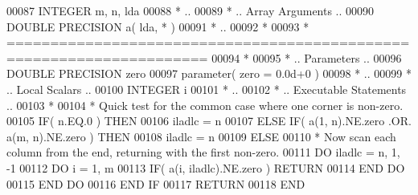 \begin{DoxyCode}
00087       \textcolor{keywordtype}{INTEGER}            m, n, lda
00088 \textcolor{comment}{*     ..}
00089 \textcolor{comment}{*     .. Array Arguments ..}
00090       \textcolor{keywordtype}{DOUBLE PRECISION}   a( lda, * )
00091 \textcolor{comment}{*     ..}
00092 \textcolor{comment}{*}
00093 \textcolor{comment}{*  =====================================================================}
00094 \textcolor{comment}{*}
00095 \textcolor{comment}{*     .. Parameters ..}
00096       \textcolor{keywordtype}{DOUBLE PRECISION} zero
00097       parameter( zero = 0.0d+0 )
00098 \textcolor{comment}{*     ..}
00099 \textcolor{comment}{*     .. Local Scalars ..}
00100       \textcolor{keywordtype}{INTEGER} i
00101 \textcolor{comment}{*     ..}
00102 \textcolor{comment}{*     .. Executable Statements ..}
00103 \textcolor{comment}{*}
00104 \textcolor{comment}{*     Quick test for the common case where one corner is non-zero.}
00105       \textcolor{keywordflow}{IF}( n.EQ.0 ) \textcolor{keywordflow}{THEN}
00106          iladlc = n
00107       \textcolor{keywordflow}{ELSE} \textcolor{keywordflow}{IF}( a(1, n).NE.zero .OR. a(m, n).NE.zero ) \textcolor{keywordflow}{THEN}
00108          iladlc = n
00109       \textcolor{keywordflow}{ELSE}
00110 \textcolor{comment}{*     Now scan each column from the end, returning with the first non-zero.}
00111          \textcolor{keywordflow}{DO} iladlc = n, 1, -1
00112             \textcolor{keywordflow}{DO} i = 1, m
00113                \textcolor{keywordflow}{IF}( a(i, iladlc).NE.zero ) \textcolor{keywordflow}{RETURN}
00114 \textcolor{keywordflow}{            END DO}
00115 \textcolor{keywordflow}{         END DO}
00116 \textcolor{keywordflow}{      END IF}
00117       \textcolor{keywordflow}{RETURN}
00118 \textcolor{keyword}{      END}
\end{DoxyCode}
